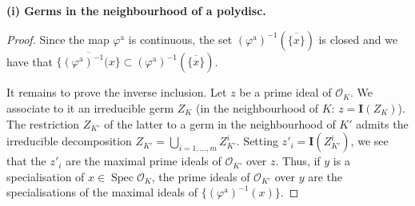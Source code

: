 \documentclass[british]{article}
\newenvironment{rmenv}[1]
  {\phantomsection\par\smallskip\noindent\textbf{#1.}\rmfamily}
  {\par\smallskip}
\begin{document}
\begin{rmenv}{(i) Germs in the neighbourhood of a polydisc}
\begin{proof}
Since the map \(\varphi^\mathrm{a}\) is continuous, the set
\((\varphi^\mathrm{a})^{-1}(\overline{\{x\}})\) is closed and we have
that
\(\overline{\{(\varphi^\mathrm{a})^{-1}(x\}}\subset(\varphi^\mathrm{a})^{-1}(\overline{\{x\}})\).

It remains to prove the inverse inclusion. Let \(z\) be a prime ideal of
\({\mathscr{O}}_K\). We associate to it an irreducible germ \(Z_K\) (in
the neighbourhood of \(K\): \(z=\mathbf{I}(Z_K)\)). The restriction
\(Z_{K'}\) of the latter to a germ in the neighbourhood of \(K'\) admits
the irreducible decomposition \(Z_{K'}=\bigcup_{i=1,\ldots,m}Z_{K'}^i\).
Setting \(z'_i=\mathbf{I}(Z_{K'}^i)\), we see that the \(z'_i\) are the
maximal prime ideals of \({\mathscr{O}}_{K'}\) over \(z\). Thus, if
\(y\) is a specialisation of
\(x\in\operatorname{Spec}{{\mathscr{O}}_K}\), the prime ideals of
\({\mathscr{O}}_{K'}\) over \(y\) are the specialisations of the maximal
ideals of \(\{(\varphi^\mathrm{a})^{-1}(x)\}\).
\end{proof}

\end{rmenv}
\end{document}
